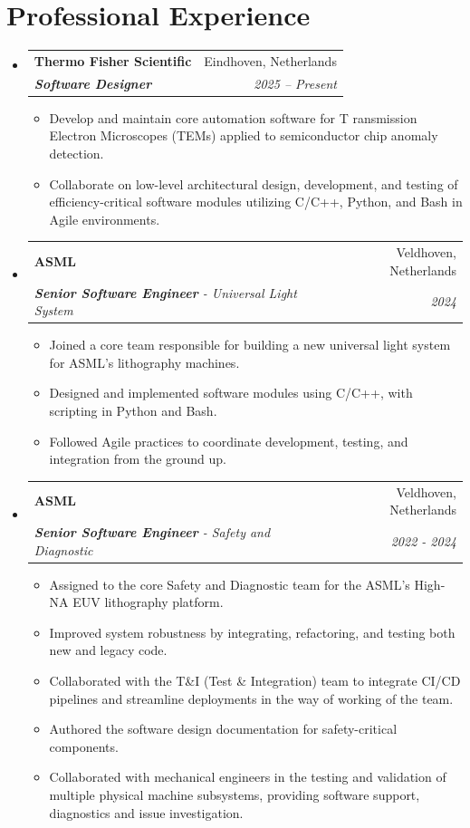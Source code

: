 \documentclass[letterpaper,10pt]{article}
\makeatletter
\newcommand{\resumeItem}[1]{
  \item\small{
    {#1 \vspace{-2pt}}
  }
}
\newcommand{\resumeSubheading}[4]{
  \vspace{-1pt}\item
    \begin{tabular*}{0.97\textwidth}[t]{l@{\extracolsep{\fill}}r}
      \textbf{#1} & #2 \\
      \textit{\small#3} & \textit{\small #4} \\
    \end{tabular*}\vspace{-5pt}
}
\makeatother
\begin{document}
\section{Professional Experience}
  \begin{itemize}[leftmargin=0.15in, label={}]

    \resumeSubheading
      {Thermo Fisher Scientific}{Eindhoven, Netherlands}
      {\textbf{Software Designer}}{2025 -- Present}
      \begin{itemize}
        \resumeItem{Develop and maintain core automation software for T
        ransmission Electron Microscopes (TEMs) applied to semiconductor 
        chip anomaly detection.}
        \resumeItem{Collaborate on low-level architectural design, 
        development, and testing of efficiency-critical software modules 
        utilizing C/C++, Python, and Bash in Agile environments.}
      \end{itemize}

    \resumeSubheading
      {ASML}{Veldhoven, Netherlands}
      {\textbf{Senior Software Engineer} - Universal Light System}{2024}
      \begin{itemize}
        \resumeItem{Joined a core team responsible for building a new 
        universal light system for ASML’s lithography machines.}
        \resumeItem{Designed and implemented software modules using C/C++, 
        with scripting in Python and Bash.}
        \resumeItem{Followed Agile practices to coordinate development, 
        testing, and integration from the ground up.}
      \end{itemize}
      
    \resumeSubheading
      {ASML}{Veldhoven, Netherlands}
      {\textbf{Senior Software Engineer} - Safety and Diagnostic}{2022 - 2024}
      \begin{itemize}
        \resumeItem{Assigned to the core Safety and Diagnostic team for 
        the ASML's High-NA EUV lithography platform.}
        \resumeItem{Improved system robustness by integrating, refactoring, 
        and testing both new and legacy code.}
        \resumeItem{Collaborated with the T\&I (Test \& Integration) team 
        to integrate CI/CD pipelines and streamline deployments in the 
        way of working of the team.}
        \resumeItem{Authored the software design documentation for 
        safety-critical components.}
        \resumeItem{Collaborated with mechanical engineers in the testing 
        and validation of multiple physical machine subsystems, 
        providing software support, diagnostics and issue investigation.}
      \end{itemize}
    

\end{itemize}
\end{document}
